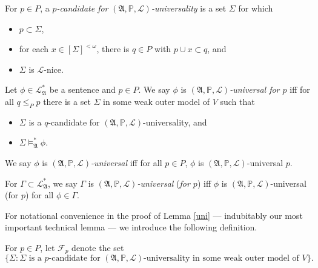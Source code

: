 \documentclass[12pt]{article}
\numberwithin{equation}{section}
\begin{document}
\begin{defi}
For $p \in P$, a $p$\emph{-candidate for} $(\mathfrak{A}, \mathbb{P}, \mathcal{L})$\emph{-universality} is a set $\Sigma$ for which
\begin{itemize}
   \item $p \subset \Sigma$,
   \item for each $x \in [\Sigma]^{<\omega}$, there is $q \in P$ with $p \cup x \subset q$, and 
   \item $\Sigma$ is $\mathcal{L}$-nice.
\end{itemize}
\end{defi}

\begin{defi}
Let $\phi \in \mathcal{L}^{*}_{\mathfrak{A}}$ be a sentence and $p \in P$. We say $\phi$ is $(\mathfrak{A}, \mathbb{P}, \mathcal{L})$\emph{-universal for $p$} iff for all $q \leq_P p$ there is a set $\Sigma$ in some weak outer model of $V$ such that 
\begin{itemize}
    \item $\Sigma$ is a $q$-candidate for $(\mathfrak{A}, \mathbb{P}, \mathcal{L})$-universality, and
    \item $\Sigma \models^*_{\mathfrak{A}} \phi$.
\end{itemize}
We say $\phi$ is $(\mathfrak{A}, \mathbb{P}, \mathcal{L})$\emph{-universal} iff for all $p \in P$, $\phi$ is $(\mathfrak{A}, \mathbb{P}, \mathcal{L})$-universal $p$. 

For $\Gamma \subset \mathcal{L}^{*}_{\mathfrak{A}}$, we say $\Gamma$ is $(\mathfrak{A}, \mathbb{P}, \mathcal{L})$\emph{-universal} (\emph{for $p$}) iff $\phi$ is $(\mathfrak{A}, \mathbb{P}, \mathcal{L})$-universal (for $p$) for all $\phi \in \Gamma$.
\end{defi}

For notational convenience in the proof of Lemma \ref{uni} --- indubitably our most important technical lemma --- we introduce the following definition.

\begin{defi}
For $p \in P$, let $\mathcal{F}_p$ denote the set 
\begin{equation*}
    \{\Sigma : \Sigma \text{ is a } p \text{-candidate for } (\mathfrak{A}, \mathbb{P}, \mathcal{L}) \text{-universality in some weak outer model of } V\}.
\end{equation*}
\end{defi}
\end{document}
